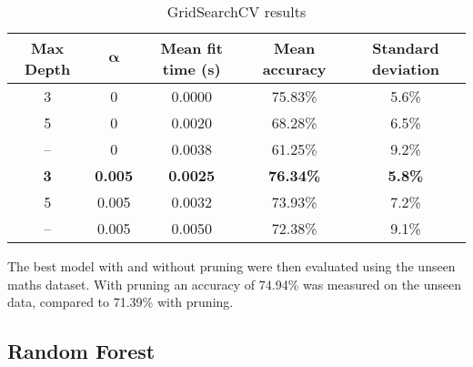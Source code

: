 \documentclass[12pt,a4paper,titlepage,twoside]{report}
\begin{document}
	\begin{table}[h]
		\centering
		\begin{tabular}{|c|c|c|c|c|}
			\hline
			\textbf{Max Depth} 	& $\boldsymbol{\alpha}$ & \textbf{Mean fit time} (s) 	& \textbf{Mean accuracy} 	& \textbf{Standard deviation}	\\ 
			\hline
			3					& 0			& 0.0000						& 75.83\%					& 5.6\%	\\
			5					& 0			& 0.0020						& 68.28\%					& 6.5\%	\\
			--					& 0			& 0.0038						& 61.25\%					& 9.2\% \\
			\textbf{3}			& \textbf{0.005}& \textbf{0.0025}			& \textbf{76.34\%}			& \textbf{5.8\%} \\
			5					& 0.005		& 0.0032						& 73.93\%					& 7.2\% \\
			--					& 0.005		& 0.0050						& 72.38\%					& 9.1\% \\
			\hline
		\end{tabular}
		\caption{GridSearchCV results}
		\label{tab:dt-results}
	\end{table}
	
	The best model with and without pruning were then evaluated using the unseen maths dataset. With pruning an accuracy of 74.94\% was measured on the unseen data, compared to 71.39\% with pruning.
	
\subsection{Random Forest}
\end{document}
